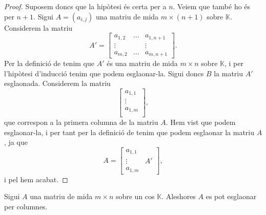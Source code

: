 \documentclass[../../Main.tex]{subfiles}
\begin{document}
\begin{proposition}
\begin{proof}
			Suposem doncs que la hipòtesi és certa per a \(n\). Veiem que també ho és per \(n+1\). Sigui \(A=(a_{i,j})\) una matriu de mida \(m\times(n+1)\) sobre \(\mathbb{K}\). Considerem la matriu
			\[A'=\left[\begin{matrix}
			a_{1,2} & \dots & a_{1,n+1} \\
			\vdots & & \vdots \\
			a_{m,2} & \dots & a_{m,n+1}
			\end{matrix}\right].\]
			Per la definició de  tenim que \(A'\) és una matriu de mida \(m\times n\) sobre \(\mathbb{K}\), i per l'hipòtesi d'inducció tenim que podem esglaonar-la. Sigui doncs \(B\) la matriu \(A'\) esglaonada. Considerem la matriu
			\[\left[\begin{matrix}
			a_{1,1}\\
			\vdots\\
			a_{1,m}\\
			\end{matrix}\right],\]
			que correspon a la primera columna de la matriu \(A\). Hem vist que podem esglaonar-la, i per tant per la definició de  tenim que podem esglaonar la matriu \(A\), ja que
			\[A=\left[\begin{array}{c|c}
			a_{1,1} & \\
			\vdots & A' \\
			a_{1,m} & 
			\end{array}\right],\]
			i pel  hem acabat.
		\end{proof}
	\end{proposition}
	\begin{corollary}
		\label{corollary:es pot esglaonar qualsevol matriu per columnes}
		Sigui \(A\) una matriu de mida \(m\times n\) sobre un cos \(\mathbb{K}\). Aleshores \(A\) es pot esglaonar per columnes.
	\end{corollary}
\end{document}
